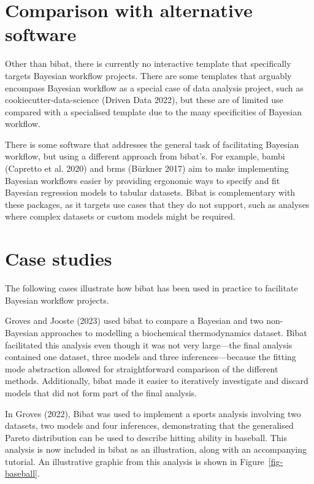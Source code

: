 \documentclass[
  letterpaper,
  DIV=11,
  numbers=noendperiod]{scrartcl}
\begin{document}
\section{Comparison with alternative
software}\label{comparison-with-alternative-software}

Other than bibat, there is currently no interactive template that
specifically targets Bayesian workflow projects. There are some
templates that arguably encompass Bayesian workflow as a special case of
data analysis project, such as cookiecutter-data-science (Driven Data
2022), but these are of limited use compared with a specialised template
due to the many specificities of Bayesian workflow.

There is some software that addresses the general task of facilitating
Bayesian workflow, but using a different approach from bibat's. For
example, bambi (Capretto et al. 2020) and brms (Bürkner 2017) aim to
make implementing Bayesian workflows easier by providing ergonomic ways
to specify and fit Bayesian regression models to tabular datasets. Bibat
is complementary with these packages, as it targets use cases that they
do not support, such as analyses where complex datasets or custom models
might be required.

\section{Case studies}\label{case-studies}

The following cases illustrate how bibat has been used in practice to
facilitate Bayesian workflow projects.

Groves and Jooste (2023) used bibat to compare a Bayesian and two
non-Bayesian approaches to modelling a biochemical thermodynamics
dataset. Bibat facilitated this analysis even though it was not very
large---the final analysis contained one dataset, three models and three
inferences---because the fitting mode abstraction allowed for
straightforward comparison of the different methods. Additionally, bibat
made it easier to iteratively investigate and discard models that did
not form part of the final analysis.

In Groves (2022), Bibat was used to implement a sports analysis
involving two datasets, two models and four inferences, demonstrating
that the generalised Pareto distribution can be used to describe hitting
ability in baseball. This analysis is now included in bibat as an
illustration, along with an accompanying tutorial. An illustrative
graphic from this analysis is shown in Figure~\ref{fig-baseball}.
\end{document}
